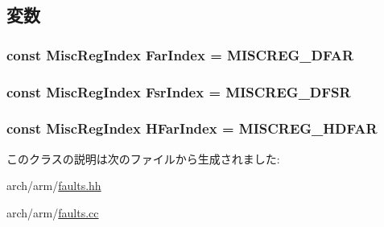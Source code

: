 \subsection{変数}
\hypertarget{classArmISA_1_1VirtualDataAbort_a3c751f200a61047c7edace6f38db43aa}{
\subsubsection[{FarIndex}]{\setlength{\rightskip}{0pt plus 5cm}const {\bf MiscRegIndex} {\bf FarIndex} = MISCREG\_\-DFAR}}
\label{classArmISA_1_1VirtualDataAbort_a3c751f200a61047c7edace6f38db43aa}
\hypertarget{classArmISA_1_1VirtualDataAbort_a0fc945049ae4ebc86b2c2765b65ab5c8}{
\subsubsection[{FsrIndex}]{\setlength{\rightskip}{0pt plus 5cm}const {\bf MiscRegIndex} {\bf FsrIndex} = MISCREG\_\-DFSR}}
\label{classArmISA_1_1VirtualDataAbort_a0fc945049ae4ebc86b2c2765b65ab5c8}
\hypertarget{classArmISA_1_1VirtualDataAbort_adf1eccd205afd5770084542cc2295d6c}{
\subsubsection[{HFarIndex}]{\setlength{\rightskip}{0pt plus 5cm}const {\bf MiscRegIndex} {\bf HFarIndex} = MISCREG\_\-HDFAR}}
\label{classArmISA_1_1VirtualDataAbort_adf1eccd205afd5770084542cc2295d6c}


このクラスの説明は次のファイルから生成されました:\begin{DoxyCompactItemize}
\item 
arch/arm/\hyperlink{arch_2arm_2faults_8hh}{faults.hh}\item 
arch/arm/\hyperlink{arch_2arm_2faults_8cc}{faults.cc}\end{DoxyCompactItemize}

